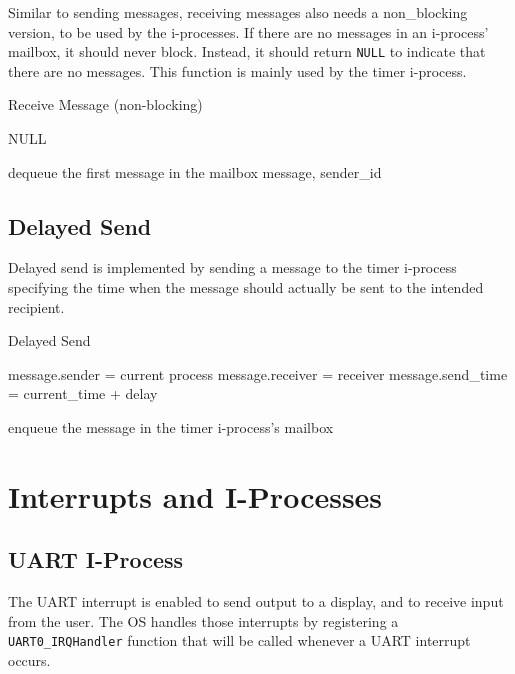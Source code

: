 \documentclass[12pt]{report}
\begin{document}
Similar to sending messages, receiving messages also needs a non_blocking version, to be used by the i-processes. If there are no messages in an i-process' mailbox, it should never block. Instead, it should return \texttt{NULL} to indicate that there are no messages. This function is mainly used by the timer i-process.

\begin{algorithm}[H]
	\caption{Receive Message (non-blocking)}
	\begin{algorithmic}[1]
				\State\Return NULL
			\EndIf

			\State dequeue the first message in the mailbox
			\State\Return message, sender_id
		\EndFunction
	\end{algorithmic}
\end{algorithm}


\subsection{Delayed Send}

Delayed send is implemented by sending a message to the timer i-process specifying the time when the message should actually be sent to the intended recipient.

\begin{algorithm}[H]
	\caption{Delayed Send}
	\begin{algorithmic}[1]
			\State message.sender = current process
			\State message.receiver = receiver
			\State message.send_time = current_time + delay

			\State enqueue the message in the timer i-process's mailbox 
		\EndFunction
	\end{algorithmic}
\end{algorithm}


\section{Interrupts and I-Processes}

\subsection{UART I-Process}

The UART interrupt is enabled to send output to a display, and to receive input from the user. The OS handles those interrupts by registering a \texttt{UART0_IRQHandler} function that will be called whenever a UART interrupt occurs.
\end{document}
